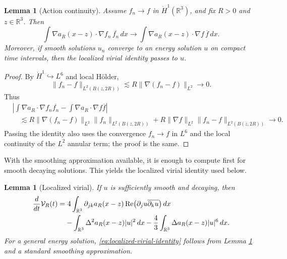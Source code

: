 \documentclass[smallextended,envcountsect,nospthms]{svjour3}
\numberwithin{equation}{section}
\theoremstyle{spbreak}
\newtheorem{lemma}[theorem]{Lemma}
\theoremstyle{spdefbreak}
\theoremstyle{spdefbreak}
\newcommand{\R}{\mathbb R}
\newcommand{\Vc}{\mathcal V}
\begin{document}
\begin{lemma}[Action continuity]\label{lem:virial-approximation}
Assume $f_n\to f$ in $\dot H^1(\R^3)$, and fix $R>0$ and $z\in\R^3$. Then
\[
  \int \nabla a_R(x-z)\cdot\nabla f_n\,\overline{f_n}\,dx
  \to
  \int \nabla a_R(x-z)\cdot\nabla f\,\overline f\,dx.
\]
Moreover, if smooth solutions $u_n$ converge to an energy solution $u$ on compact time intervals, then the localized virial identity passes to $u$.
\end{lemma}

\begin{proof}
By $\dot H^1\hookrightarrow L^6$ and local H\"older,
\[
  \|f_n-f\|_{L^2(B(z,2R))}
  \lesssim R\|\nabla(f_n-f)\|_{L^2}\to0.
\]
Thus
\[
\begin{aligned}
  &\left|\int \nabla a_R\cdot\nabla f_n\overline{f_n}
  -\int \nabla a_R\cdot\nabla f\overline f\right| \\
  &\quad\lesssim R\|\nabla(f_n-f)\|_{L^2}\|f_n\|_{L^2(B(z,2R))}
  +R\|\nabla f\|_{L^2}\|f_n-f\|_{L^2(B(z,2R))}\to0.
\end{aligned}
\]
Passing the identity also uses the convergence $f_n\to f$ in $L^6$ and the local continuity of the $L^2$ annular term; the proof is the same.
\end{proof}

With the smoothing approximation available, it is enough to compute first for smooth decaying solutions. This yields the localized virial identity used below.

\begin{lemma}[Localized virial]\label{lem:localized-virial}
If $u$ is sufficiently smooth and decaying, then
\begin{align}
  \frac{d}{dt}\Vc_R(t)
  =&\ 4\int_{\R^3}\partial_{jk}a_R(x-z)
  \operatorname{Re}\bigl(\partial_ju\overline{\partial_ku}\bigr)\,dx\notag\\
  &-\int_{\R^3}\Delta^2a_R(x-z)|u|^2\,dx
  -\frac43\int_{\R^3}\Delta a_R(x-z)|u|^6\,dx.
  \label{eq:localized-virial-identity}
\end{align}
For a general energy solution, \eqref{eq:localized-virial-identity} follows from Lemma \ref{lem:virial-approximation} and a standard smoothing approximation.
\end{lemma}
\end{document}
